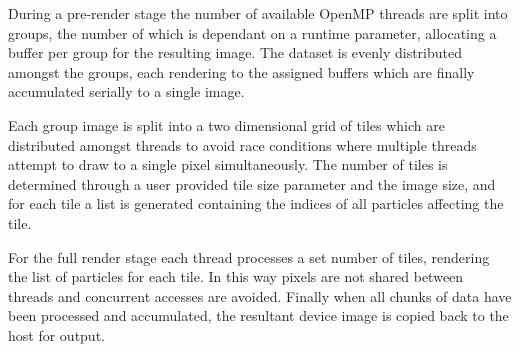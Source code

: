 \documentclass[runningheads,a4paper]{llncs}
\begin{document}

During a pre-render stage the number of available OpenMP threads are split into groups, the number of which is dependant on 
a runtime parameter, allocating a buffer per group for the resulting image. The dataset is evenly distributed amongst the 
groups, each rendering to the assigned buffers which are finally accumulated serially to a single image. 

Each group image is split into a two dimensional grid of tiles which are distributed amongst threads to avoid race 
conditions where multiple threads attempt to draw to a single pixel simultaneously. The number of tiles is determined 
through a user provided tile size parameter and the image size, and for each tile a list is generated containing the 
indices of all particles affecting the tile.

For the full render stage each thread processes a set number of tiles, rendering the list of particles for each tile. 
In this way pixels are not shared between threads and concurrent accesses are avoided. Finally when all 
chunks of data have been processed and accumulated, the resultant device image is copied back to the host for output. 


\end{document}
